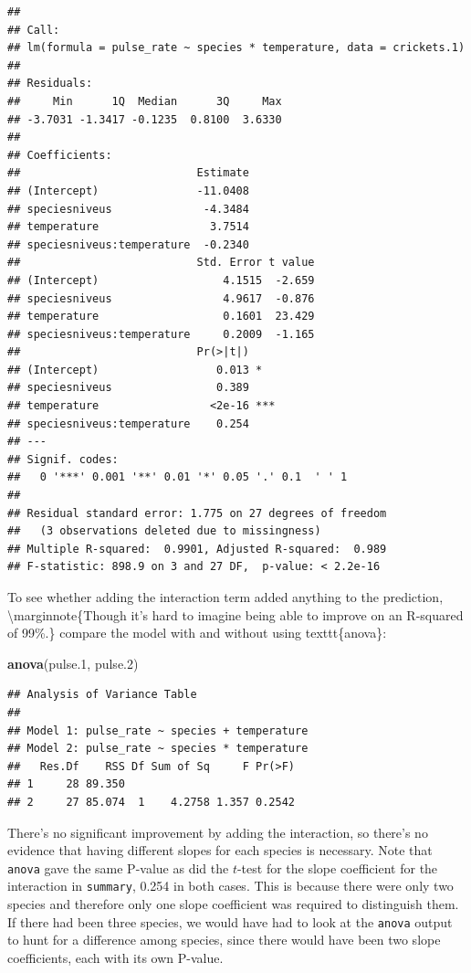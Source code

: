 \documentclass[]{tufte-book}
\newenvironment{Shaded}{}{}
\newcommand{\FloatTok}[1]{\textcolor[rgb]{0.25,0.63,0.44}{#1}}
\newcommand{\KeywordTok}[1]{\textcolor[rgb]{0.00,0.44,0.13}{\textbf{#1}}}
\newcommand{\NormalTok}[1]{#1}
\theoremstyle{definition}
\theoremstyle{definition}
\theoremstyle{definition}
\theoremstyle{remark}
\begin{document}
\begin{verbatim}
## 
## Call:
## lm(formula = pulse_rate ~ species * temperature, data = crickets.1)
## 
## Residuals:
##     Min      1Q  Median      3Q     Max 
## -3.7031 -1.3417 -0.1235  0.8100  3.6330 
## 
## Coefficients:
##                           Estimate
## (Intercept)               -11.0408
## speciesniveus              -4.3484
## temperature                 3.7514
## speciesniveus:temperature  -0.2340
##                           Std. Error t value
## (Intercept)                   4.1515  -2.659
## speciesniveus                 4.9617  -0.876
## temperature                   0.1601  23.429
## speciesniveus:temperature     0.2009  -1.165
##                           Pr(>|t|)    
## (Intercept)                  0.013 *  
## speciesniveus                0.389    
## temperature                 <2e-16 ***
## speciesniveus:temperature    0.254    
## ---
## Signif. codes:  
##   0 '***' 0.001 '**' 0.01 '*' 0.05 '.' 0.1  ' ' 1
## 
## Residual standard error: 1.775 on 27 degrees of freedom
##   (3 observations deleted due to missingness)
## Multiple R-squared:  0.9901, Adjusted R-squared:  0.989 
## F-statistic: 898.9 on 3 and 27 DF,  p-value: < 2.2e-16
\end{verbatim}

To see whether adding the interaction term added anything to the
prediction, \textbackslash{}marginnote\{Though it's hard to imagine
being able to improve on an R-squared of 99\%.\} compare the model with
and without using texttt\{anova\}:

\begin{Shaded}
\begin{Highlighting}[]
\KeywordTok{anova}\NormalTok{(pulse}\FloatTok{.1}\NormalTok{, pulse}\FloatTok{.2}\NormalTok{)}
\end{Highlighting}
\end{Shaded}

\begin{verbatim}
## Analysis of Variance Table
## 
## Model 1: pulse_rate ~ species + temperature
## Model 2: pulse_rate ~ species * temperature
##   Res.Df    RSS Df Sum of Sq     F Pr(>F)
## 1     28 89.350                          
## 2     27 85.074  1    4.2758 1.357 0.2542
\end{verbatim}

There's no significant improvement by adding the interaction, so there's
no evidence that having different slopes for each species is necessary.
Note that \texttt{anova} gave the same P-value as did the \(t\)-test for
the slope coefficient for the interaction in \texttt{summary}, 0.254 in
both cases. This is because there were only two species and therefore
only one slope coefficient was required to distinguish them. If there
had been three species, we would have had to look at the \texttt{anova}
output to hunt for a difference among species, since there would have
been two slope coefficients, each with its own P-value.
\end{document}

